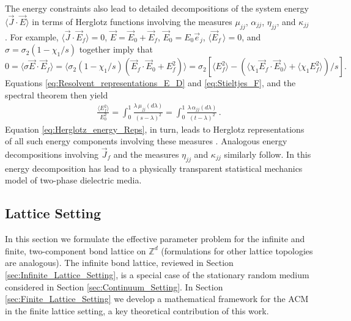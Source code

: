 \documentclass{cmslatex}
\begin{document}
The energy constraints also lead to detailed decompositions of the
system energy $\langle\vec{J}\cdot\vec{E}\rangle$ in terms of Herglotz functions
involving the measures $\mu_{jj}$, $\alpha_{jj}$, $\eta_{jj}$, and $\kappa_{jj}$
\cite{Murphy:JMP:063506,Murphy_Thermo_Stat_Mech}. For 
example, $\langle\vec{J}\cdot\vec{E}_f\rangle=0$, $\vec{E}=\vec{E}_0+\vec{E}_f$, 
$\vec{E}_0=E_0\vec{e}_j$, $\langle\vec{E}_f\,\rangle=0$, and $\sigma=\sigma_2(1-\chi_1/s)$ together
imply that $0=\langle\sigma\vec{E}\cdot\vec{E}_f\rangle=\langle\sigma_2(1-\chi_1/s)(\vec{E}_f\cdot\vec{E}_0+E_f^2)\rangle 
=\sigma_2\left[\langle E_f^2\rangle- (\langle\chi_1\vec{E}_f\cdot\vec{E}_0\rangle+\langle\chi_1E_f^2\rangle)/s\right].$
Equations \eqref{eq:Resolvent_representations_E_D} and
\eqref{eq:Stieltjes_F}, and the spectral theorem \cite{Reed-1980} then
yield \cite{Murphy:JMP:063506,Murphy_Thermo_Stat_Mech}  
%
\begin{align}\label{eq:Herglotz_energy_Reps}
 \frac{\langle E_f^2\rangle}{E_0^2}=\int_0^1 \frac{\lambda\,\mu_{jj}(d\lambda)}{(s-\lambda)^2}
           =\int_0^1 \frac{\lambda\,\alpha_{jj}(d\lambda)}{(t-\lambda)^2}\,. 
\end{align}
%
Equation \eqref{eq:Herglotz_energy_Reps}, in turn, leads to Herglotz
representations of all such energy components involving
these measures \cite{Murphy_Thermo_Stat_Mech}. Analogous energy
decompositions involving $\vec{J}_f$ and the measures $\eta_{jj}$ and
$\kappa_{jj}$ similarly follow. In \cite{Murphy_Thermo_Stat_Mech} this
energy decomposition has lead to a physically transparent statistical
mechanics model of two-phase dielectric media.


\subsection{Lattice Setting}
\label{sec:Lattice_Setting}
%
In this section we formulate the effective parameter problem for the
infinite and finite, two-component bond lattice on $\mathbb{Z}^d$
(formulations for other lattice topologies are analogous). The
infinite bond lattice, reviewed in Section
\ref{sec:Infinite_Lattice_Setting}, is a special case of the
stationary random medium considered in Section
\ref{sec:Continuum_Setting}. In Section
\ref{sec:Finite_Lattice_Setting} we develop a mathematical framework
for the ACM in the finite lattice setting, a key theoretical
contribution of this work. 
\end{document}
